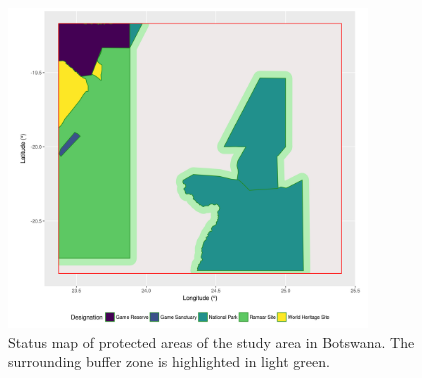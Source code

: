 \documentclass[12pt,a4paper, twoside, english]{article}
\begin{document}
\begin{figure}[H]
  \centering
  \includegraphics[width=0.85\textwidth]{figures/Status_WDPA_BWA.png}
  \caption[Status of PAs of Ngamiland]{Status map of protected areas of the study area in Botswana. The surrounding buffer zone is highlighted in light green.}
  \label{fig:status_wdpa_bwa}
\end{figure}




\end{document}
